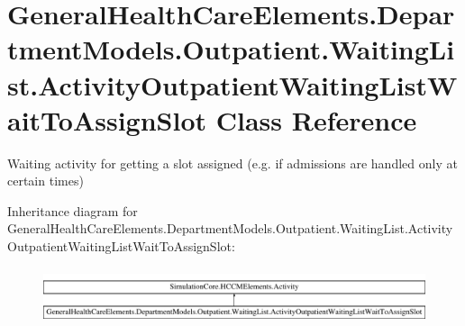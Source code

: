 \hypertarget{class_general_health_care_elements_1_1_department_models_1_1_outpatient_1_1_waiting_list_1_1_act8586a0b22c75d36396c6c75291998c21}{}\section{General\+Health\+Care\+Elements.\+Department\+Models.\+Outpatient.\+Waiting\+List.\+Activity\+Outpatient\+Waiting\+List\+Wait\+To\+Assign\+Slot Class Reference}
\label{class_general_health_care_elements_1_1_department_models_1_1_outpatient_1_1_waiting_list_1_1_act8586a0b22c75d36396c6c75291998c21}


Waiting activity for getting a slot assigned (e.\+g. if admissions are handled only at certain times)  


Inheritance diagram for General\+Health\+Care\+Elements.\+Department\+Models.\+Outpatient.\+Waiting\+List.\+Activity\+Outpatient\+Waiting\+List\+Wait\+To\+Assign\+Slot\+:\begin{figure}[H]
\begin{center}
\leavevmode
\includegraphics[height=1.664190cm]{class_general_health_care_elements_1_1_department_models_1_1_outpatient_1_1_waiting_list_1_1_act8586a0b22c75d36396c6c75291998c21}
\end{center}
\end{figure}
